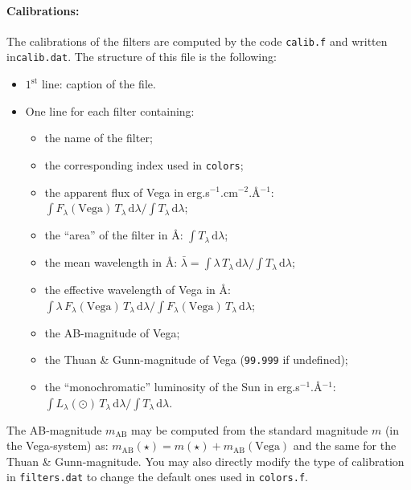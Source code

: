 \documentclass[11pt,draft,fleqn]{article}
\begin{document}
\paragraph{Calibrations:}
The calibrations of the filters are computed by the code
\texttt{calib.f} and written in\linebreak \texttt{calib.dat}.
The structure of this file is the following:
\begin{itemize}
\item
$1^{\mathrm{st}}$ line: caption of the file.
\item
One line for each filter containing:
\begin{itemize}
\item the name of the filter;
\item the corresponding index used in \texttt{colors}; 
\item the apparent flux of Vega in erg.s$^{-1}$.cm$^{-2}$.\AA$^{-1}$: $\int
F_{\lambda}(\mathrm{Vega})\,T_{\lambda}\,\mathrm{d}\lambda/\int T_{\lambda}\,\mathrm{d}\lambda$;
\item the ``area'' of the filter in \AA: $\int T_{\lambda}\,\mathrm{d}\lambda$;
\item the mean wavelength in \AA: $\bar{\lambda}=\int \lambda\,T_{\lambda}\,\mathrm{d}\lambda/\int T_{\lambda}\,\mathrm{d}\lambda$;
\item the effective wavelength of Vega in \AA: $\int
\lambda\,F_{\lambda}(\mathrm{Vega})\,T_{\lambda}\,\mathrm{d}\lambda/
\int F_{\lambda}(\mathrm{Vega})\,T_{\lambda}\,\mathrm{d}\lambda$;
\item the AB-magnitude of Vega;
\item the Thuan \& Gunn-magnitude of Vega (\texttt{99.999} if undefined);
\item the ``monochromatic'' luminosity of the Sun in erg.s$^{-1}$.\AA$^{-1}$: $\int
L_{\lambda}(\odot)\,T_{\lambda}\,\mathrm{d}\lambda/\int T_{\lambda}\,\mathrm{d}\lambda$.
\end{itemize}
\end{itemize}
The AB-magnitude $m_{\mathrm{AB}}$ may be computed from the standard
magnitude $m$ (in the Vega-system) as:
$m_{\mathrm{AB}}(\star)=m(\star)+m_{\mathrm{AB}}(\mathrm{Vega})$
and the same for the Thuan \& Gunn-magnitude. You may also directly
modify the type of calibration in \texttt{filters.dat} to change the
default ones used in \texttt{colors.f}.
\end{document}
